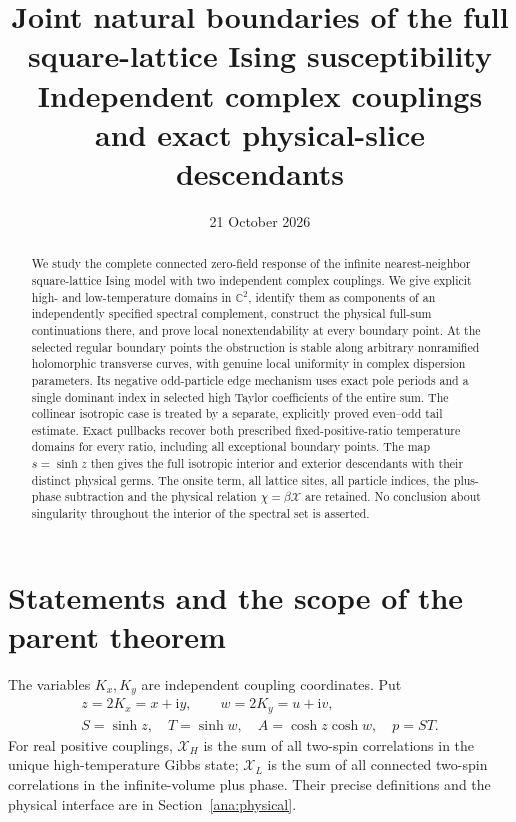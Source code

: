 \documentclass[11pt]{article}
\title{Joint natural boundaries of the full square-lattice\newline
Ising susceptibility\newline
\large Independent complex couplings and exact physical-slice descendants}
\author{}
\date{21 October 2026}
\numberwithin{equation}{section}
\theoremstyle{definition}
\newcommand{\C}{\mathbb C}
\newcommand{\ii}{\mathrm i}
\begin{document}
\maketitle
\begin{abstract}
We study the complete connected zero-field response of the infinite
nearest-neighbor square-lattice Ising model with two independent complex
couplings. We give explicit high- and low-temperature domains in
\(\C^2\), identify them as components of an independently specified
spectral complement, construct the physical full-sum continuations there,
and prove local nonextendability at every boundary point. At the selected
regular boundary points the obstruction is stable along arbitrary
nonramified holomorphic transverse curves,
with genuine local uniformity in complex dispersion parameters. Its
negative odd-particle edge mechanism uses exact pole periods and a single
dominant index in selected high Taylor coefficients of the entire sum.
The collinear isotropic case is treated by a separate, explicitly proved
even--odd tail estimate. Exact pullbacks recover both prescribed
fixed-positive-ratio temperature domains for every ratio, including all
exceptional boundary points. The map \(s=\sinh z\) then gives the full
isotropic interior and exterior descendants with their distinct physical
germs. The onsite term, all lattice sites, all particle indices, the
plus-phase subtraction and the physical relation \(\chi=\beta\mathcal X\)
are retained. No conclusion about singularity throughout the interior
of the spectral set is asserted.
\end{abstract}

\section{Statements and the scope of the parent theorem}
\label{main:statement}

The variables \(K_x,K_y\) are independent coupling coordinates.
Put
\[
 \begin{gathered}
 z=2K_x=x+\ii y,\qquad w=2K_y=u+\ii v,\\
 S=\sinh z,\quad T=\sinh w,\quad A=\cosh z\cosh w,\quad p=ST.
 \end{gathered}
\]
For real positive couplings, \(\mathcal X_H\) is the sum of all
two-spin correlations in the unique high-temperature Gibbs state;
\(\mathcal X_L\) is the sum of all connected two-spin correlations
in the infinite-volume plus phase. Their precise definitions and the
physical interface are in Section~\ref{ana:physical}.
\end{document}
